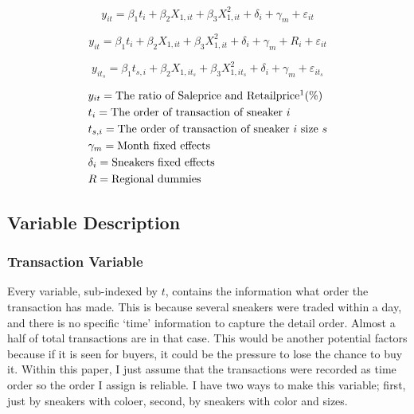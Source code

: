 \documentclass[a4paper]{article}
\theoremstyle{definition}
\theoremstyle{definition}
\theoremstyle{remark}
\begin{document}
\begin{large}
\begin{equation}
	y_{it} = \beta_{1}t_{i} + \beta_{2}X_{1,it} + \beta_{3}X^{2}_{1,it} + \delta_{i} + \gamma_{m} + \varepsilon_{it}
\end{equation}

\begin{equation}
	y_{it} = \beta_{1}t_{i} + \beta_{2}X_{1,it} + \beta_{3}X^{2}_{1,it} + \delta_{i}+\gamma_{m} + R_{i} + \varepsilon_{it}
\end{equation}

\begin{equation}
	y_{it_{s}} = \beta_{1}t_{s,i} + \beta_{2}X_{1,it_{s}} + \beta_{3}X^{2}_{1,it_{s}} + \delta_{i}+\gamma_{m}  + \varepsilon_{it_{s}}
\end{equation}


\begin{align*}
	& y_{it} = \text{The ratio of Saleprice and Retailprice}\footnotemark  (\%) \\
	& t_{i} = \text{The order of transaction of sneaker $ i $} \\
	& t_{s,i} = \text{The order of transaction of sneaker $ i $ size $ s $} \\
	& \gamma_{m} = \text{Month fixed effects} \\
	& \delta_{i} = \text{Sneakers fixed effects} \\
	& R = \text{Regional dummies} \\
\end{align*}

\addtocounter{footnote}{-1}

\addtocounter{footnote}{1}



\subsection{Variable Description}

\subsubsection{Transaction Variable}

Every variable, sub-indexed by $ t $, contains the information what order the transaction has made. This is because several sneakers were traded within a day, and there is no specific `time' information to capture the detail order. Almost a half of total transactions are in that case. This would be another potential factors because if it is seen for buyers, it could be the pressure to lose the chance to buy it. Within this paper, I just assume that the transactions were recorded as time order so the order I assign is reliable. I have two ways to make this variable; first, just by sneakers with coloer, second, by sneakers with color and sizes.


\end{large}
\end{document}
